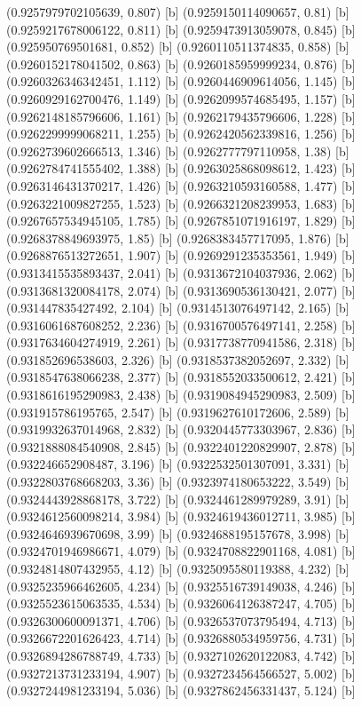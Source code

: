 {{{(0.9257979702105639, 0.807) [b] 
(0.9259150114090657, 0.81) [b] 
(0.9259217678006122, 0.811) [b] 
(0.9259473913059078, 0.845) [b] 
(0.925950769501681, 0.852) [b] 
(0.9260110511374835, 0.858) [b] 
(0.9260152178041502, 0.863) [b] 
(0.9260185959999234, 0.876) [b] 
(0.9260326346342451, 1.112) [b] 
(0.9260446909614056, 1.145) [b] 
(0.9260929162700476, 1.149) [b] 
(0.9262099574685495, 1.157) [b] 
(0.9262148185796606, 1.161) [b] 
(0.9262179435796606, 1.228) [b] 
(0.9262299999068211, 1.255) [b] 
(0.9262420562339816, 1.256) [b] 
(0.9262739602666513, 1.346) [b] 
(0.9262777797110958, 1.38) [b] 
(0.9262784741555402, 1.388) [b] 
(0.9263025868098612, 1.423) [b] 
(0.9263146431370217, 1.426) [b] 
(0.9263210593160588, 1.477) [b] 
(0.9263221009827255, 1.523) [b] 
(0.9266321208239953, 1.683) [b] 
(0.9267657534945105, 1.785) [b] 
(0.9267851071916197, 1.829) [b] 
(0.9268378849693975, 1.85) [b] 
(0.9268383457717095, 1.876) [b] 
(0.9268876513272651, 1.907) [b] 
(0.9269291235353561, 1.949) [b] 
(0.9313415535893437, 2.041) [b] 
(0.9313672104037936, 2.062) [b] 
(0.9313681320084178, 2.074) [b] 
(0.9313690536130421, 2.077) [b] 
(0.931447835427492, 2.104) [b] 
(0.9314513076497142, 2.165) [b] 
(0.9316061687608252, 2.236) [b] 
(0.9316700576497141, 2.258) [b] 
(0.9317634604274919, 2.261) [b] 
(0.9317738770941586, 2.318) [b] 
(0.931852696538603, 2.326) [b] 
(0.9318537382052697, 2.332) [b] 
(0.9318547638066238, 2.377) [b] 
(0.9318552033500612, 2.421) [b] 
(0.9318616195290983, 2.438) [b] 
(0.9319084945290983, 2.509) [b] 
(0.931915786195765, 2.547) [b] 
(0.9319627610172606, 2.589) [b] 
(0.9319932637014968, 2.832) [b] 
(0.9320445773303967, 2.836) [b] 
(0.9321888084540908, 2.845) [b] 
(0.9322401220829907, 2.878) [b] 
(0.932246652908487, 3.196) [b] 
(0.9322532501307091, 3.331) [b] 
(0.9322803768668203, 3.36) [b] 
(0.9323974180653222, 3.549) [b] 
(0.9324443928868178, 3.722) [b] 
(0.9324461289979289, 3.91) [b] 
(0.9324612560098214, 3.984) [b] 
(0.9324619436012711, 3.985) [b] 
(0.9324646939670698, 3.99) [b] 
(0.9324688195157678, 3.998) [b] 
(0.9324701946986671, 4.079) [b] 
(0.9324708822901168, 4.081) [b] 
(0.9324814807432955, 4.12) [b] 
(0.9325095580119388, 4.232) [b] 
(0.9325235966462605, 4.234) [b] 
(0.9325516739149038, 4.246) [b] 
(0.9325523615063535, 4.534) [b] 
(0.9326064126387247, 4.705) [b] 
(0.9326300600091371, 4.706) [b] 
(0.9326537073795494, 4.713) [b] 
(0.9326672201626423, 4.714) [b] 
(0.9326880534959756, 4.731) [b] 
(0.9326894286788749, 4.733) [b] 
(0.9327102620122083, 4.742) [b] 
(0.9327213731233194, 4.907) [b] 
(0.9327234564566527, 5.002) [b] 
(0.9327244981233194, 5.036) [b] 
(0.9327862456331437, 5.124) [b] 
}}}
